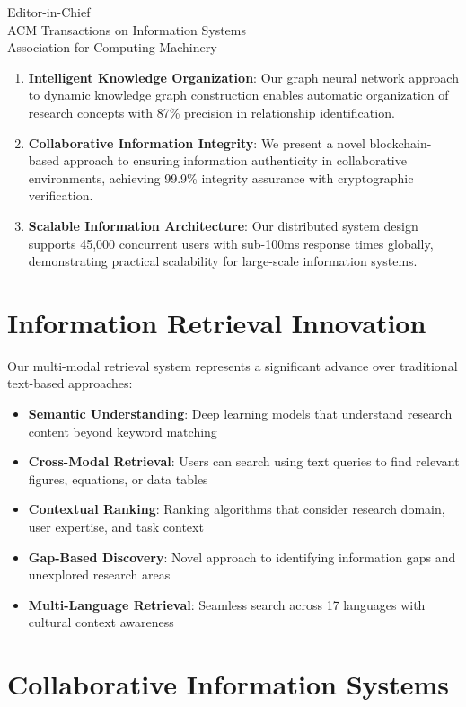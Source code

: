 \documentclass[11pt]{letter}
\begin{document}
\begin{letter}{Editor-in-Chief\\
ACM Transactions on Information Systems\\
Association for Computing Machinery}
\begin{enumerate}
    \item \textbf{Intelligent Knowledge Organization}: Our graph neural network approach to dynamic knowledge graph construction enables automatic organization of research concepts with 87\% precision in relationship identification.
    
    \item \textbf{Collaborative Information Integrity}: We present a novel blockchain-based approach to ensuring information authenticity in collaborative environments, achieving 99.9\% integrity assurance with cryptographic verification.
    
    \item \textbf{Scalable Information Architecture}: Our distributed system design supports 45,000 concurrent users with sub-100ms response times globally, demonstrating practical scalability for large-scale information systems.
\end{enumerate}

\section*{Information Retrieval Innovation}

Our multi-modal retrieval system represents a significant advance over traditional text-based approaches:

\begin{itemize}
    \item \textbf{Semantic Understanding}: Deep learning models that understand research content beyond keyword matching
    \item \textbf{Cross-Modal Retrieval}: Users can search using text queries to find relevant figures, equations, or data tables
    \item \textbf{Contextual Ranking}: Ranking algorithms that consider research domain, user expertise, and task context
    \item \textbf{Gap-Based Discovery}: Novel approach to identifying information gaps and unexplored research areas
    \item \textbf{Multi-Language Retrieval}: Seamless search across 17 languages with cultural context awareness
\end{itemize}

\section*{Collaborative Information Systems}


\end{letter}
\end{document}
